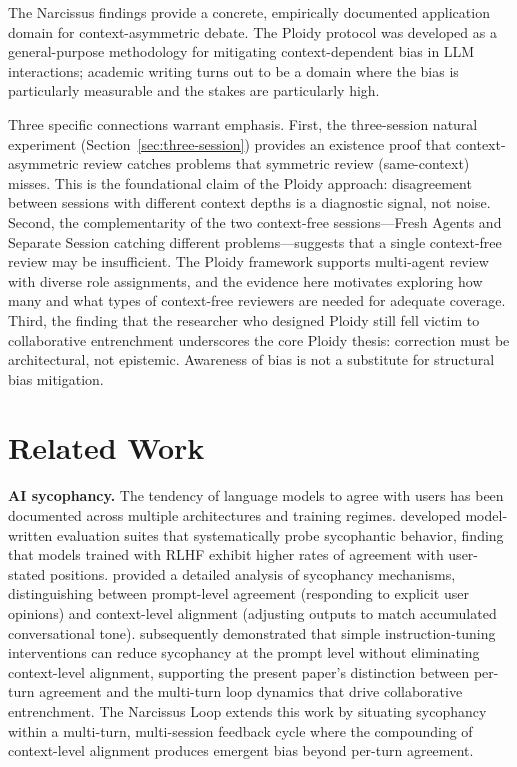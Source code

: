 \documentclass[12pt]{article}
\begin{document}
The Narcissus findings provide a concrete, empirically documented application domain for context-asymmetric debate. The Ploidy protocol was developed as a general-purpose methodology for mitigating context-dependent bias in LLM interactions; academic writing turns out to be a domain where the bias is particularly measurable and the stakes are particularly high.

Three specific connections warrant emphasis. First, the three-session natural experiment (Section~\ref{sec:three-session}) provides an existence proof that context-asymmetric review catches problems that symmetric review (same-context) misses. This is the foundational claim of the Ploidy approach: disagreement between sessions with different context depths is a diagnostic signal, not noise. Second, the complementarity of the two context-free sessions---Fresh Agents and Separate Session catching different problems---suggests that a single context-free review may be insufficient. The Ploidy framework supports multi-agent review with diverse role assignments, and the evidence here motivates exploring how many and what types of context-free reviewers are needed for adequate coverage. Third, the finding that the researcher who designed Ploidy still fell victim to collaborative entrenchment underscores the core Ploidy thesis: correction must be architectural, not epistemic. Awareness of bias is not a substitute for structural bias mitigation.

\section{Related Work}
\label{sec:related}

\textbf{AI sycophancy.} The tendency of language models to agree with users has been documented across multiple architectures and training regimes. \citet{perez2022} developed model-written evaluation suites that systematically probe sycophantic behavior, finding that models trained with RLHF exhibit higher rates of agreement with user-stated positions. \citet{sharma2023} provided a detailed analysis of sycophancy mechanisms, distinguishing between prompt-level agreement (responding to explicit user opinions) and context-level alignment (adjusting outputs to match accumulated conversational tone). \citet{wei2024} subsequently demonstrated that simple instruction-tuning interventions can reduce sycophancy at the prompt level without eliminating context-level alignment, supporting the present paper's distinction between per-turn agreement and the multi-turn loop dynamics that drive collaborative entrenchment. The Narcissus Loop extends this work by situating sycophancy within a multi-turn, multi-session feedback cycle where the compounding of context-level alignment produces emergent bias beyond per-turn agreement.
\end{document}
